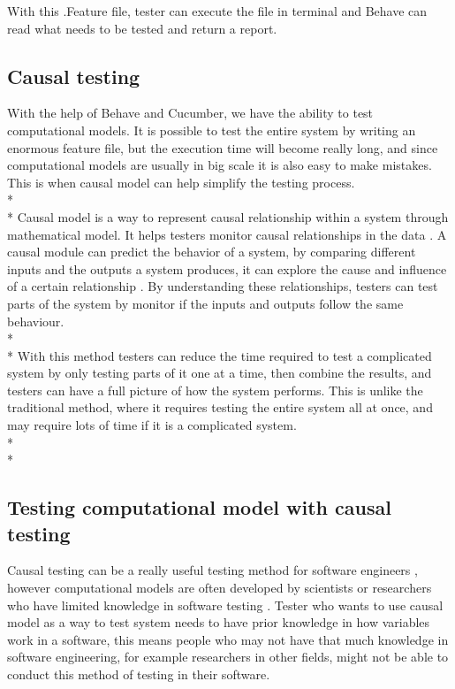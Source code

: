 \newpage \noindent With this .Feature file, tester can execute the file in terminal and Behave can read what needs to be tested and return a report.
\subsection{Causal testing}
With the help of Behave and Cucumber, we have the ability to test computational models. It is possible to test the entire system by writing an enormous feature file, but the execution time will become really long, and since computational models are usually in big scale it is also easy to make mistakes. This is when causal model can help simplify the testing process. \\*\\*
Causal model is a way to represent causal relationship within a system through mathematical model. It helps testers monitor causal relationships in the data \cite{Reference11}. A causal module can predict the behavior of a system, by comparing different inputs and the outputs a system produces, it can explore the cause and influence of a certain relationship \cite{Reference12}. By understanding these relationships, testers can test parts of the system by monitor if the inputs and outputs follow the same behaviour. \\*\\*
With this method testers can reduce the time required to test a complicated system by only testing parts of it one at a time, then combine the results, and testers can have a full picture of how the system performs. This is unlike the traditional method, where it requires testing the entire system all at once, and may require lots of time if it is a complicated system. \\*\\*

\subsection{Testing computational model with causal testing}
Causal testing can be a really useful testing method for software engineers \cite{Reference13}, however computational models are often developed by scientists or researchers who have limited knowledge in software testing \cite{Reference8}. Tester who wants to use causal model as a way to test system needs to have prior knowledge in how variables work in a software, this means people who may not have that much knowledge in software engineering, for example researchers in other fields, might not be able to conduct this method of testing in their software.

